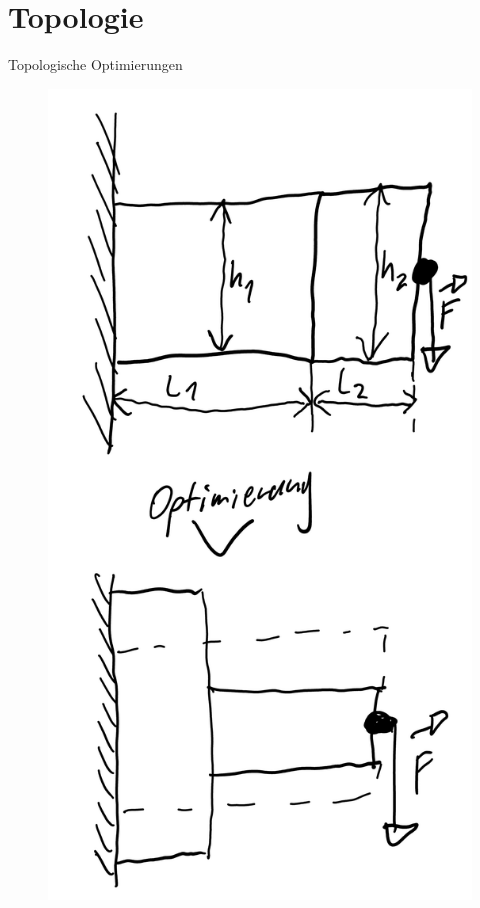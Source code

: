 \documentclass{beamer}
\begin{document}
\section{Topologie}
\begin{frame}{Topologische Optimierungen}
    \begin{figure}[htbp]
        \begin{minipage}{0.2\textwidth}
            \centering
            \includegraphics[width=\linewidth]{figures/Groesen-opt.png}

\end{minipage}
\end{figure}
\end{frame}
\end{document}
